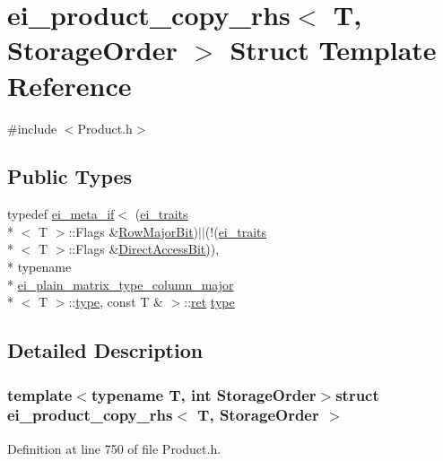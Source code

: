 \hypertarget{structei__product__copy__rhs}{\section{ei\-\_\-product\-\_\-copy\-\_\-rhs$<$ T, Storage\-Order $>$ Struct Template Reference}
\label{structei__product__copy__rhs}
}


{\ttfamily \#include $<$Product.\-h$>$}

\subsection*{Public Types}
\begin{DoxyCompactItemize}
\item 
typedef \hyperlink{structei__meta__if}{ei\-\_\-meta\-\_\-if}$<$ (\hyperlink{structei__traits}{ei\-\_\-traits}\\*
$<$ T $>$\-::Flags \&\hyperlink{group__flags_ga7bd49e7b260e869e10fb9dc4fd081a85}{Row\-Major\-Bit})$|$$|$(!(\hyperlink{structei__traits}{ei\-\_\-traits}\\*
$<$ T $>$\-::Flags \&\hyperlink{group__flags_ga54c3b872f5a14e7e0d3d6539b704ea67}{Direct\-Access\-Bit})), \\*
typename \\*
\hyperlink{structei__plain__matrix__type__column__major}{ei\-\_\-plain\-\_\-matrix\-\_\-type\-\_\-column\-\_\-major}\\*
$<$ T $>$\-::\hyperlink{structei__product__copy__rhs_a2e6fae70002bc52ee5d3f10e34bd28c5}{type}, const T \& $>$\-::\hyperlink{group___i_p_conn_plugin_gabc99fe6afec1a75ccff1092e47375a40}{ret} \hyperlink{structei__product__copy__rhs_a2e6fae70002bc52ee5d3f10e34bd28c5}{type}
\end{DoxyCompactItemize}


\subsection{Detailed Description}
\subsubsection*{template$<$typename T, int Storage\-Order$>$struct ei\-\_\-product\-\_\-copy\-\_\-rhs$<$ T, Storage\-Order $>$}



Definition at line 750 of file Product.\-h.



